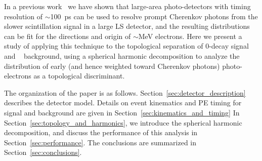  In a previous work~\cite{Aberle2014} we have shown that large-area
photo-detectors with timing resolution of $\sim$100~ps can be used to
resolve prompt Cherenkov photons from the slower scintillation signal
in a large LS detector, and the resulting distributions can be fit for
the directions and origin of $\sim$MeV electrons. Here we present a
study of applying this technique to the topological separation of
0\nbb-decay signal and \B~ background, using a spherical harmonic
decomposition to analyze the distribution of early (and hence weighted
toward Cherenkov photons) photo-electrons as a topological
discriminant.

The organization of the paper is as follows. 
Section~\ref{sec:detector_description} describes
the detector model. Details on event
kinematics and PE timing for signal and background are given in
Section~\ref{sec:kinematics_and_timing} In
Section~\ref{sec:topology_and_harmonics}, we introduce the spherical
harmonic decomposition, and discuss the performance of this analysis
in Section~\ref{sec:performance}. The conclusions are summarized in  Section~\ref{sec:conclusions}.




  
